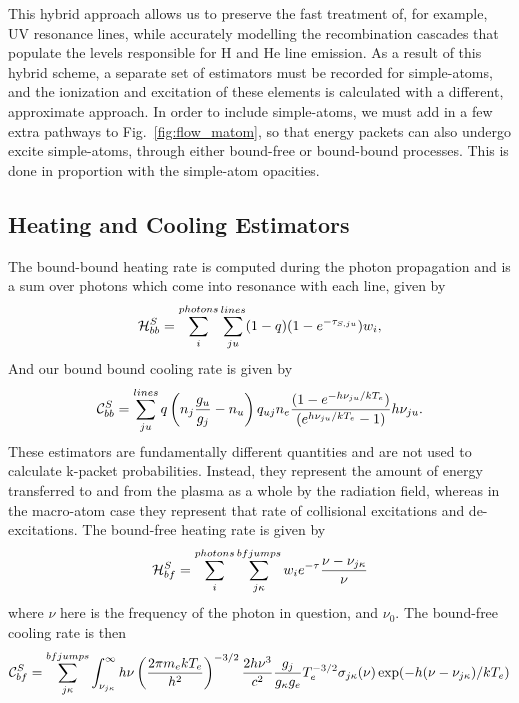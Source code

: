 This hybrid approach allows us to preserve the fast treatment 
of, for example, UV resonance lines, while accurately 
modelling the recombination cascades that populate the levels 
responsible for H and He line emission. As a result of this hybrid
scheme, a separate set of estimators must be recorded for simple-atoms, 
and the ionization and excitation of these elements is calculated 
with a different, approximate approach.
In order to include simple-atoms, we must add in a few extra pathways
to Fig.~\ref{fig:flow_matom}, so that energy packets can also
undergo excite simple-atoms, through either bound-free or bound-bound
processes. This is done in proportion with the simple-atom opacities.


\subsection{Heating and Cooling Estimators}
\label{sec:simple_hc}

The bound-bound heating rate is computed during the photon propagation and is a sum
over photons which come into resonance with each line, given by 
\begin{equation}
{\cal H}_{bb}^S = \sum_i^{photons} \sum^{lines}_{ju} (1 - q) (1 - e^{-\tau_{S,ju}}) w_i,
\end{equation}
And our bound bound cooling rate is given by 
\begin{equation}
{\cal C}_{bb}^S = \sum_{ju}^{lines} q \left(n_j\frac{g_u}{g_j} - n_u\right) q_{uj} n_e 
\frac{(1 - e^{-h\nu_{ju}/kT_e})}{(e^{h\nu_{ju}/kT_e} - 1)}  h \nu_{ju}.
\end{equation}
These estimators are fundamentally different quantities and are not used to
calculate k-packet probabilities. Instead, they represent the amount of
energy transferred to and from the plasma as a whole by the radiation field,
whereas in the macro-atom case they represent that rate of collisional excitations
and de-excitations.
\noindent
The bound-free heating rate is given by
\begin{equation}
{\cal H}_{bf}^S = \sum_i^{photons} \sum_{j\kappa}^{bfjumps} w_{i} e^{-\tau} \frac{\nu - \nu_{j\kappa}}{\nu}
\end{equation}
where $\nu$ here is the frequency of the photon in question, and $\nu_{0}$.
The bound-free cooling rate is then
\begin{equation}
{\cal C}_{bf}^S = \sum_{j\kappa}^{bfjumps} \int_{\nu_{j \kappa}}^\infty
h \nu \left(\frac{2 \pi m_e k T_e}{h^2} \right)^{-3/2}
\frac{2 h \nu^3}{c^2} 
\frac{g_j}{g_\kappa g_e}
T_e^{-3/2} \sigma_{j \kappa} (\nu) 
\exp(- h (\nu - \nu_{j \kappa}) / kT_e)
\end{equation}

